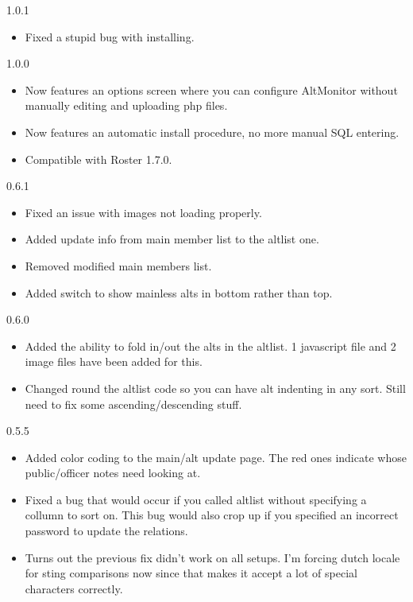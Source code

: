 \documentclass[12pt, a4paper]{article}
\begin{document}
\begin{description}
\item{1.0.1}
\begin{itemize}
\item Fixed a stupid bug with installing.
\end{itemize}

\item{1.0.0}
\begin{itemize}
\item Now features an options screen where you can configure AltMonitor without
   manually editing and uploading php files.
\item Now features an automatic install procedure, no more manual SQL entering.
\item Compatible with Roster 1.7.0.
\end{itemize}

\item{0.6.1}
\begin{itemize}
\item Fixed an issue with images not loading properly.
\item Added update info from main member list to the altlist one.
\item Removed modified main members list.
\item Added switch to show mainless alts in bottom rather than top.
\end{itemize}

\item{0.6.0}
\begin{itemize}
\item Added the ability to fold in/out the alts in the altlist. 1 javascript file
   and 2 image files have been added for this.
\item Changed round the altlist code so you can have alt indenting in any sort.
   Still need to fix some ascending/descending stuff.
\end{itemize}

\item{0.5.5}
\begin{itemize}
\item Added color coding to the main/alt update page. The red ones indicate
   whose public/officer notes need looking at.
\item Fixed a bug that would occur if you called altlist without specifying a
   collumn to sort on. This bug would also crop up if you specified an
   incorrect password to update the relations.
\item Turns out the previous fix didn't work on all setups. I'm forcing dutch
   locale for sting comparisons now since that makes it accept a lot of special
   characters correctly.
\end{itemize}


\end{description}
\end{document}
